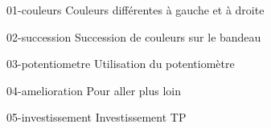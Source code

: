 {
    \begin{question}{01-couleurs}
        Couleurs différentes à gauche et à droite 
    \end{question}

    \begin{question}{02-succession}
        Succession de couleurs sur le bandeau
    \end{question}

    \begin{question}{03-potentiometre}
        Utilisation du potentiomètre
    \end{question}

    \begin{question}{04-amelioration}
        Pour aller plus loin
    \end{question}

    \begin{question}{05-investissement}
        Investissement TP
    \end{question}

}




